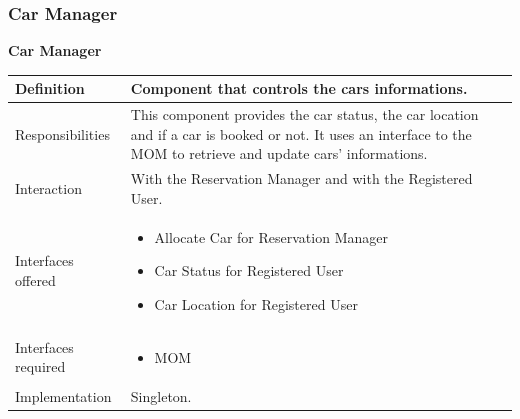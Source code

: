 \documentclass{article}
\begin{document}
			\subsubsection{Car Manager}
			\begin{minipage}{\linewidth}
			\end{minipage}
			
			\begin{center}
				\centerline{\textbf{Car Manager}}	
				\begin{tabular}{| l | p{9cm} |}\hline
					Definition & Component that controls the cars informations.\\\hline
					Responsibilities & This component provides the car status, the car location and if a car is booked or not. It uses an interface to the MOM to retrieve and update cars' informations.\\\hline
					Interaction & With the Reservation Manager and with the Registered User.\\\hline
					Interfaces offered & \begin{itemize}
						\item Allocate Car for Reservation Manager
						\item Car Status for Registered User
						\item Car Location for Registered User
					\end{itemize}\\\hline
					Interfaces required & \begin{itemize}
						\item MOM
					\end{itemize}\\\hline
					Implementation & Singleton.\\\hline
				\end{tabular}
			\end{center}
			\pagebreak
			
\end{document}
